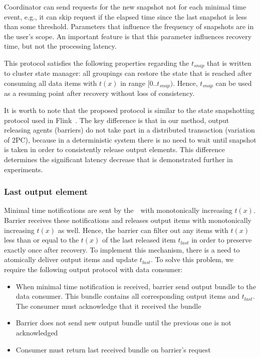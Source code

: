 Coordinator can send requests for the new snapshot not for each minimal time event, e.g., it can skip request if the elapsed time since the last snapshot is less than some threshold. Parameters that influence the frequency of snapshots are in the user's scope. An important feature is that this parameter influences recovery time, but not the processing latency.

This protocol satisfies the following properties regarding the $t_{snap}$ that is written to cluster state manager: all groupings can restore the state that is reached after consuming all data items with $t(x)$ in range $[0..t_{snap})$. Hence, $t_{snap}$ can be used as a resuming point after recovery without loss of consistency.

It is worth to note that the proposed protocol is similar to the state snapshotting protocol used in Flink~\cite{Carbone:2017:SMA:3137765.3137777}. The key difference is that in our method, output releasing agents (barriers) do not take part in a distributed transaction (variation of 2PC), because in a deterministic system there is no need to wait until snapshot is taken in order to consistently release output elements. This difference determines the significant latency decrease that is demonstrated further in experiments.

\subsubsection{Last output element}

Minimal time notifications are sent by the~\Acker\ with monotonically increasing $t(x)$. Barrier receives these notifications and releases output items with monotonically increasing $t(x)$ as well. Hence, the barrier can filter out any items with $t(x)$ less than or equal to the $t(x)$ of the last released item $t_{last}$ in order to preserve exactly once after recovery. To implement this mechanism, there is a need to atomically deliver output items and update $t_{last}$. To solve this problem, we require the following output protocol with data consumer: 

\begin{itemize}
    \item When minimal time notification is received, barrier send output bundle to the data consumer. This bundle contains all corresponding output items and $t_{last}$. The consumer must acknowledge that it received the bundle
    \item Barrier does not send new output bundle until the previous one is not acknowledged
    \item Consumer must return last received bundle on barrier's request 
\end{itemize}

